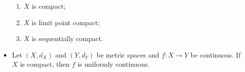 \documentclass[10pt]{article}
\begin{document}
\begin{multicols*}{3}
\begin{itemize}
            \begin{enumerate}
                \item $X$ is compact;
                \item $X$ is limit point compact;
                \item $X$ is sequentially compact.
            \end{enumerate}
            \item Let $\left(X, d_X\right)$ and $\left(Y, d_Y\right)$ be metric spaces and $f \colon X \to Y$ be continuous. If $X$ is compact, then $f$ is uniformly continuous.
        \end{itemize}
    \end{multicols*}
\end{document}
